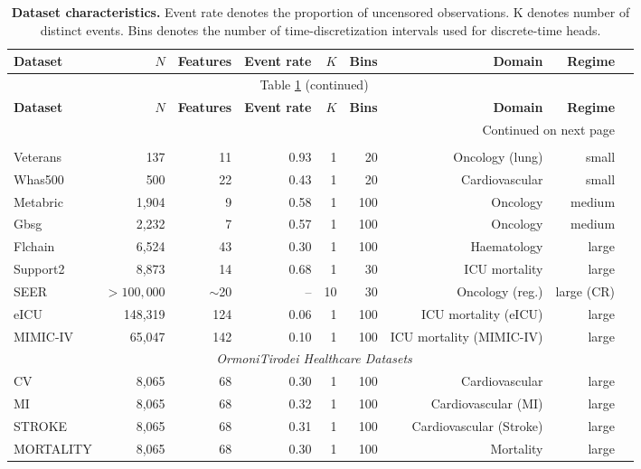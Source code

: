 \begin{longtable}{lrrrrrrrl}
\caption{\textbf{Dataset characteristics.} Event rate denotes the proportion of uncensored observations. K denotes number of distinct events. Bins denotes the number of time-discretization intervals used for discrete-time heads.} \label{tab:datasets_all} \\
\toprule
\textbf{Dataset} & \textbf{$N$} & \textbf{Features} & \textbf{Event rate} & \textbf{$K$} & \textbf{Bins} & \textbf{Domain} & \textbf{Regime} \\
\midrule
\endfirsthead
\multicolumn{8}{c}{Table \ref{tab:datasets_all} (continued)} \\
\toprule
\textbf{Dataset} & \textbf{$N$} & \textbf{Features} & \textbf{Event rate} & \textbf{$K$} & \textbf{Bins} & \textbf{Domain} & \textbf{Regime} \\
\midrule
\endhead
\midrule
\multicolumn{8}{r}{Continued on next page} \\
\endfoot
\bottomrule
\endlastfoot
\multicolumn{8}{c}{\textit{Standard Benchmarks}} \\
\midrule
Veterans & 137 & 11 & 0.93 & 1 & 20 & Oncology (lung) & small \\
Whas500 & 500 & 22 & 0.43 & 1 & 20 & Cardiovascular & small \\
Metabric & 1,904 & 9 & 0.58 & 1 & 100 & Oncology & medium \\
Gbsg & 2,232 & 7 & 0.57 & 1 & 100 & Oncology & medium \\
Flchain & 6,524 & 43 & 0.30 & 1 & 100 & Haematology & large \\
Support2 & 8,873 & 14 & 0.68 & 1 & 30 & ICU mortality & large \\
SEER & $>100{,}000$ & $\sim$20 & -- & 10 & 30 & Oncology (reg.) & large (CR) \\
eICU & 148,319 & 124 & 0.06 & 1 & 100 & ICU mortality (eICU) & large \\
MIMIC-IV & 65,047 & 142 & 0.10 & 1 & 100 & ICU mortality (MIMIC-IV) & large \\
\midrule
\multicolumn{8}{c}{\textit{OrmoniTirodei Healthcare Datasets}} \\
\midrule
CV & 8,065 & 68 & 0.30 & 1 & 100 & Cardiovascular & large \\
MI & 8,065 & 68 & 0.32 & 1 & 100 & Cardiovascular (MI) & large \\
STROKE & 8,065 & 68 & 0.31 & 1 & 100 & Cardiovascular (Stroke) & large \\
MORTALITY & 8,065 & 68 & 0.30 & 1 & 100 & Mortality & large \\

\end{longtable}
